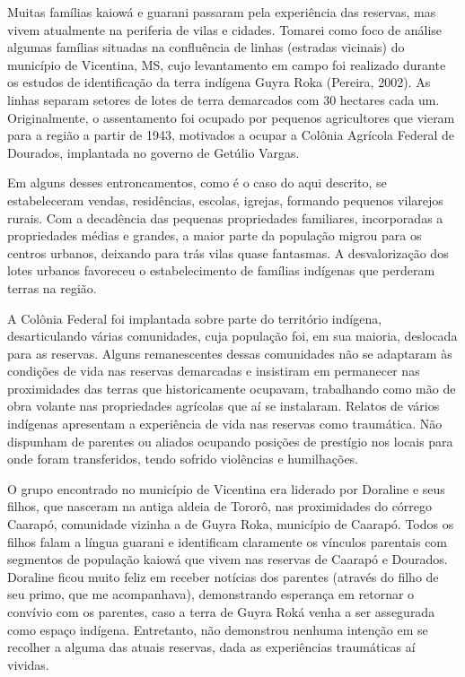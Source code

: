 \documentclass{article}
\begin{document}
Muitas fam\'ilias kaiow\'a e guarani passaram pela experi\^encia das
reservas, mas vivem atualmente na periferia de vilas e cidades. Tomarei
como foco de an\'alise algumas fam\'ilias situadas na conflu\^encia de
linhas (estradas vicinais) do munic\'ipio de Vicentina, MS, cujo
levantamento em campo foi realizado durante os estudos de
identifica\c{c}\~ao da terra ind\'igena Guyra Roka (Pereira, 2002). As
linhas separam setores de lotes de terra demarcados com 30 hectares
cada um. Originalmente, o assentamento foi ocupado por pequenos
agricultores que vieram para a regi\~ao a partir de 1943, motivados a
ocupar a Col\^onia Agr\'icola Federal de Dourados, implantada no
governo de Get\'ulio Vargas.

Em alguns desses entroncamentos, como \'e o caso do aqui descrito, se
estabeleceram vendas, resid\^encias, escolas, igrejas, formando
pequenos vilarejos rurais. Com a decad\^encia das pequenas propriedades
familiares, incorporadas a propriedades m\'edias e grandes, a maior
parte da popula\c{c}\~ao migrou para os centros urbanos, deixando para
tr\'as vilas quase fantasmas. A desvaloriza\c{c}\~ao dos lotes urbanos
favoreceu o estabelecimento de fam\'ilias ind\'igenas que perderam
terras na regi\~ao.

A Col\^onia Federal foi implantada sobre parte do territ\'orio
ind\'igena, desarticulando v\'arias comunidades, cuja popula\c{c}\~ao
foi, em sua maioria, deslocada para as reservas. Alguns remanescentes
dessas comunidades n\~ao se adaptaram \`as condi\c{c}\~oes de vida nas
reservas demarcadas e insistiram em permanecer nas proximidades das
terras que historicamente ocupavam, trabalhando como m\~ao de obra
volante nas propriedades agr\'icolas que a\'i se instalaram. Relatos de
v\'arios ind\'igenas apresentam a experi\^encia de vida nas reservas
como traum\'atica. N\~ao dispunham de parentes ou aliados ocupando
posi\c{c}\~oes de prest\'igio nos locais para onde foram transferidos,
tendo sofrido viol\^encias e humilha\c{c}\~oes.

O grupo encontrado no munic\'ipio de Vicentina era liderado por Doraline
e seus filhos, que nasceram na antiga aldeia de Toror\^o, nas
proximidades do c\'orrego Caarap\'o, comunidade vizinha a de Guyra
Roka, munic\'ipio de Caarap\'o. Todos os filhos falam a l\'ingua
guarani e identificam claramente os v\'inculos parentais com segmentos
de popula\c{c}\~ao kaiow\'a que vivem nas reservas de Caarap\'o e
Dourados. Doraline ficou muito feliz em receber not\'icias dos parentes
(atrav\'es do filho de seu primo, que me acompanhava), demonstrando
esperan\c{c}a em retornar o conv\'ivio com os parentes, caso a terra de
Guyra Rok\'a venha a ser assegurada como espa\c{c}o ind\'igena.
Entretanto, n\~ao demonstrou nenhuma inten\c{c}\~ao em se recolher a
alguma das atuais reservas, dada as experi\^encias traum\'aticas a\'i
vividas.
\end{document}
